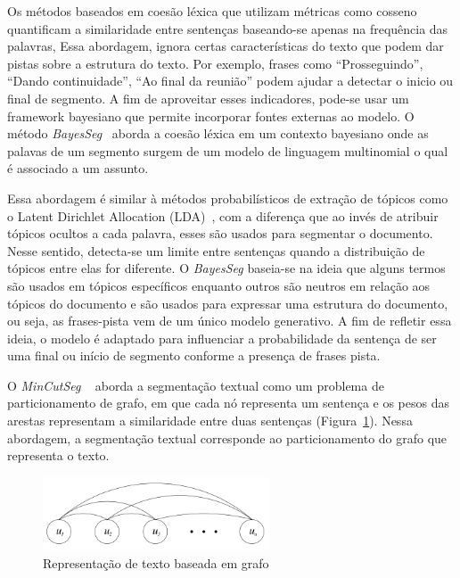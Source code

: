 




Os métodos baseados em coesão léxica que utilizam métricas como cosseno quantificam a similaridade entre sentenças baseando-se apenas na frequência das palavras, Essa abordagem, ignora certas características do texto que podem dar pistas sobre a estrutura do texto. Por exemplo, frases como ``Prosseguindo'', ``Dando continuidade'', ``Ao final da reunião'' podem ajudar a detectar o inicio ou final de segmento. A fim de aproveitar esses indicadores, pode-se usar um framework bayesiano que permite incorporar fontes externas ao modelo. O método \textit{BayesSeg}~\cite{Eis2008} aborda a coesão léxica em um contexto bayesiano onde as palavas de um segmento surgem de um modelo de linguagem multinomial o qual é associado a um assunto. 

Essa abordagem é similar à métodos probabilísticos de extração de tópicos como o Latent Dirichlet Allocation (LDA)~\cite{Blei2003}, com a diferença que ao invés de atribuir tópicos ocultos a cada palavra, esses são usados para segmentar o documento. Nesse sentido, detecta-se um limite entre sentenças quando a distribuição de tópicos entre elas for diferente. O \textit{BayesSeg} baseia-se na ideia que alguns termos são usados em tópicos específicos enquanto outros são neutros em relação aos tópicos do documento e são usados para expressar uma estrutura do documento, ou seja, as frases-pista vem de um único modelo generativo. A fim de refletir essa ideia, o modelo é adaptado para influenciar a probabilidade da sentença de ser uma final ou início de segmento conforme a presença de frases pista.








O \textit{MinCutSeg} ~\cite{Malioutov:2006a} aborda a segmentação textual como um problema de particionamento de grafo, em que cada nó representa um sentença e os pesos das arestas representam a similaridade entre duas sentenças (Figura~\ref{fig:representacao-texto-grafo}). Nessa abordagem, a segmentação textual corresponde ao particionamento do grafo que representa o texto.


  \begin{figure}[!h]
	  \centering
	  \includegraphics[width=0.6\textwidth]{conteudo/capitulos/figs/graph-representation-of-text.png}
	  \caption{Representação de texto baseada em grafo~\cite{Malioutov:2006a}}
	  \label{fig:representacao-texto-grafo}
  \end{figure}


